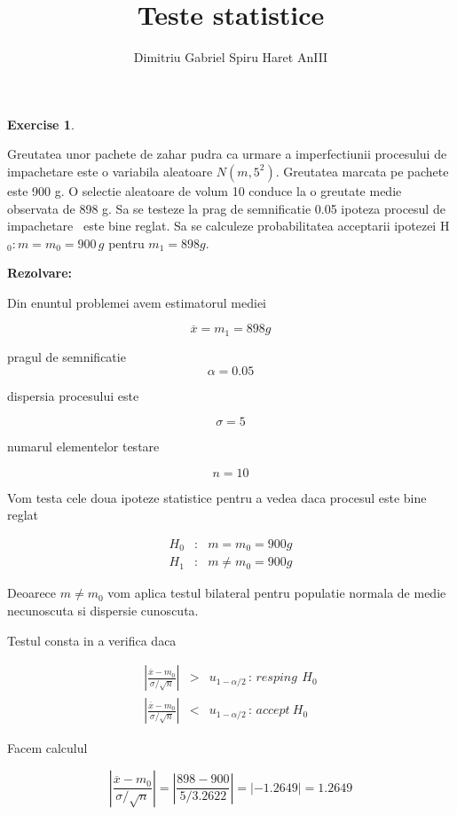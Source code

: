 \documentclass{article}
\newtheorem{exercise}[theorem]{Exercise}
\begin{document}
\title{Teste statistice}
\author{Dimitriu Gabriel Spiru Haret AnIII}
\maketitle

\begin{exercise}
\bigskip 
\end{exercise}

Greutatea unor pachete de zahar pudra ca urmare a imperfectiunii procesului
de impachetare este o variabila aleatoare $N(m,5^{2})$. Greutatea marcata pe
pachete este 900 g. O selectie aleatoare de volum 10 conduce la o greutate
medie observata de 898 g. Sa se testeze la prag de semnificatie 0.05 ipoteza
procesul de impachetare \ este bine reglat. Sa se calculeze probabilitatea
acceptarii ipotezei H$_{0}:m=m_{0}=900\,g$ pentru $m_{1}=898g.$

\textbf{Rezolvare:}

Din enuntul problemei avem estimatorul mediei 

\[
\overline{x}=m_{1}=898g
\]

pragul de semnificatie 
\[
\alpha =0.05
\]

dispersia procesului este

\[
\sigma =5
\]

numarul elementelor testare

\[
n=10
\]

Vom testa cele doua ipoteze statistice pentru a vedea daca procesul este
bine reglat

\begin{eqnarray*}
H_{0} &:&m=m_{0}=900g \\
H_{1} &:&m\neq m_{0}=900g
\end{eqnarray*}

Deoarece $m\neq m_{0}$ vom aplica testul bilateral pentru populatie normala
de medie necunoscuta si dispersie cunoscuta.

Testul consta in a verifica daca

\begin{eqnarray*}
\left\vert \frac{\overline{x}-m_{0}}{\sigma /\sqrt{n}}\right\vert 
&>&u_{1-\alpha /2}\,:\,resping\,\ H_{0} \\
\left\vert \frac{\overline{x}-m_{0}}{\sigma /\sqrt{n}}\right\vert 
&<&u_{1-\alpha /2}\,:\,accept\ H_{0}
\end{eqnarray*}

Facem calculul

\[
\left\vert \frac{\overline{x}-m_{0}}{\sigma /\sqrt{n}}\right\vert
=\left\vert \frac{898-900}{5/3.2622}\right\vert =\left\vert
-1.2649\right\vert =1.2649
\]
\end{document}
